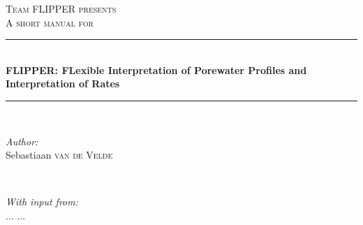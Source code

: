 \documentclass[10pt]{article}
\begin{document}
\begin{titlepage}

\newcommand{\HRule}{\rule{\linewidth}{0.5mm}} %

\center %
 

\textsc{\LARGE Team FLIPPER presents}\\[1.5cm] %
\vspace{3cm}
\textsc{\Large A short manual for}\\[0.5cm] %


\HRule \\[0.4cm]
{ \huge \bfseries FLIPPER: FLexible Interpretation of Porewater Profiles and Interpretation of Rates }\\[0.4cm] %
\HRule \\[1.5cm]
 

\begin{minipage}{0.4\textwidth}
\begin{flushleft} \large
\emph{Author:}\\
Sebastiaan \textsc{van de Velde} %
\end{flushleft}
\end{minipage}
~
\begin{minipage}{0.4\textwidth}
\begin{flushright} \large
\emph{With input from:} \\
... \textsc{...} %
\end{flushright}
\end{minipage}\\[2cm]



\end{titlepage}
\end{document}
